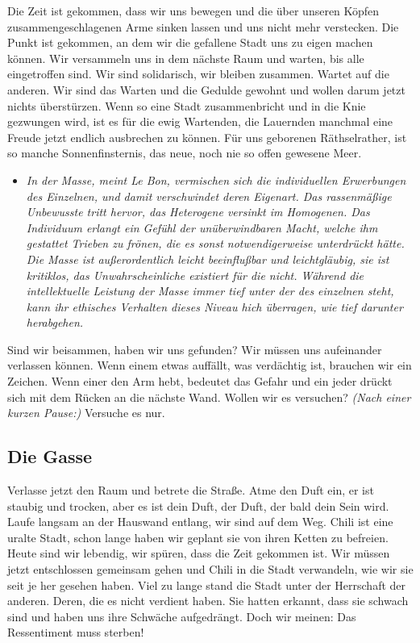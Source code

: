 \documentclass[a4paper, 12pt]{report}
\begin{document}
Die Zeit ist gekommen, dass wir uns bewegen und die über unseren Köpfen zusammengeschlagenen Arme sinken lassen und uns nicht mehr verstecken. 
Die Punkt ist gekommen, an dem wir die gefallene Stadt uns zu eigen machen können. 
Wir versammeln uns in dem nächste Raum und warten, bis alle eingetroffen sind.
Wir sind solidarisch, wir bleiben zusammen. 
Wartet auf die anderen. Wir sind das Warten und die Gedulde gewohnt und wollen darum jetzt nichts überstürzen.
Wenn so eine Stadt zusammenbricht und in die Knie gezwungen wird, ist es für die ewig Wartenden, die Lauernden manchmal eine Freude jetzt endlich ausbrechen zu können. 
Für uns geborenen Räthselrather, ist so manche Sonnenfinsternis, das neue, noch nie so offen gewesene Meer. 
\begin{itemize}
    \item[] \textit{In der Masse, meint Le Bon, vermischen sich die individuellen Erwerbungen des Einzelnen, und damit verschwindet deren Eigenart. 
Das rassenmäßige Unbewusste tritt hervor, das Heterogene versinkt im Homogenen.
Das Individuum erlangt ein Gefühl der unüberwindbaren Macht, welche ihm gestattet Trieben zu frönen, die es sonst notwendigerweise unterdrückt hätte.
Die Masse ist außerordentlich leicht beeinflußbar und leichtgläubig, sie ist kritiklos, das Unwahrscheinliche existiert für die nicht.
Während die intellektuelle Leistung der Masse  immer tief unter der des einzelnen steht, kann ihr ethisches Verhalten dieses Niveau hich überragen, wie tief darunter herabgehen.}
\end{itemize}

Sind wir beisammen, haben wir uns gefunden? 
Wir müssen uns aufeinander verlassen können. 
Wenn einem etwas auffällt, was verdächtig ist, brauchen wir ein Zeichen.
Wenn einer den Arm hebt, bedeutet das Gefahr und ein jeder drückt sich mit dem Rücken an die nächste Wand. 
Wollen wir es versuchen?
\textit{(Nach einer kurzen Pause:)} Versuche es nur.  \\

\subsection{Die Gasse}

Verlasse jetzt den Raum und betrete die Straße. 
Atme den Duft ein, er ist staubig und trocken, aber es ist dein Duft, der Duft, der bald dein Sein wird.
Laufe langsam an der Hauswand entlang, wir sind auf dem Weg.
Chili ist eine uralte Stadt, schon lange haben wir geplant sie von ihren Ketten zu befreien. 
Heute sind wir lebendig, wir spüren, dass die Zeit gekommen ist.
Wir müssen jetzt entschlossen gemeinsam gehen und Chili in die Stadt verwandeln, wie wir sie seit je her gesehen haben.
Viel zu lange stand die Stadt unter der Herrschaft der anderen. Deren, die es nicht verdient haben.
Sie hatten erkannt, dass sie schwach sind und haben uns ihre Schwäche aufgedrängt. 
Doch wir meinen: Das Ressentiment muss sterben!\\
\end{document}
